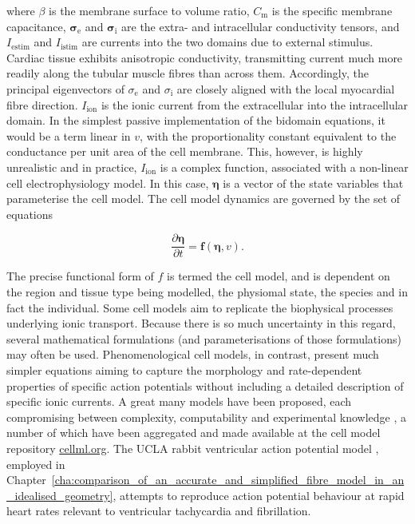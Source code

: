   where $\beta$ is the membrane surface to volume ratio, $C_\text{m}$ is the specific membrane capacitance, $\boldsymbol\sigma_\text{e}$ and $\boldsymbol\sigma_\text{i}$ are the extra- and intracellular conductivity tensors, and $I_\text{estim}$ and $I_\text{istim}$ are currents into the two domains due to external stimulus. Cardiac tissue exhibits anisotropic conductivity, transmitting current much more readily along the tubular muscle fibres than across them. Accordingly, the principal eigenvectors of $\sigma_\text{e}$ and $\sigma_\text{i}$ are closely aligned with the local myocardial fibre direction. $I_\text{ion}$ is the ionic current from the extracellular into the intracellular domain. In the simplest passive implementation of the bidomain equations, it would be a term linear in $v$, with the proportionality constant equivalent to the conductance per unit area of the cell membrane. This, however, is highly unrealistic and in practice, $I_\text{ion}$ is a complex function, associated with a non-linear cell electrophysiology model. In this case, $\boldsymbol\eta$ is a vector of the state variables that parameterise the cell model. The cell model dynamics are governed by the set of equations
  
  \begin{equation}
    \frac{\partial \boldsymbol\eta}{\partial t} = \mathbf{f}\left(\boldsymbol\eta, v \right).
  \end{equation}
  
  The precise functional form of $f$ is termed the cell model, and is dependent on the region and tissue type being modelled, the physiomal state, the species and in fact the individual. Some cell models aim to replicate the biophysical processes underlying ionic transport. Because there is so much uncertainty in this regard, several mathematical formulations (and parameterisations of those formulations) may often be used. Phenomenological cell models, in contrast, present much simpler equations aiming to capture the morphology and rate-dependent properties of specific action potentials without including a detailed description of specific ionic currents. A great many models have been proposed, each compromising between complexity, computability and experimental knowledge \cite{Noble2011,Carusi2012}, a number of which have been aggregated and made available at the cell model repository \url{cellml.org}. The UCLA rabbit ventricular action potential model \cite{Mahajan2008}, employed in Chapter~\ref{cha:comparison_of_an_accurate_and_simplified_fibre_model_in_an_idealised_geometry}, attempts to reproduce action potential behaviour at rapid heart rates relevant to ventricular tachycardia and fibrillation.
  
